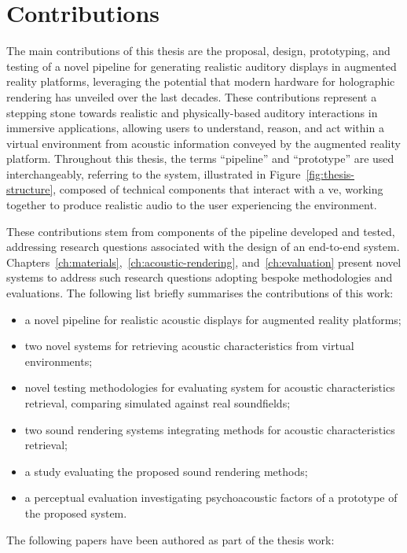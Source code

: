 \section{Contributions}
The main contributions of this thesis are the proposal, design, prototyping, and testing of a novel pipeline for generating realistic auditory displays in augmented reality platforms, leveraging the potential that modern hardware for holographic rendering has unveiled over the last decades. These contributions represent a stepping stone towards realistic and physically-based auditory interactions in immersive applications, allowing users to understand, reason, and act within a virtual environment from acoustic information conveyed by the augmented reality platform. Throughout this thesis, the terms ``pipeline'' and ``prototype'' are used interchangeably, referring to the system, illustrated in Figure~\ref{fig:thesis-structure}, composed of technical components that interact with a \acrshort{ve}, working together to produce realistic audio to the user experiencing the environment.\par
These contributions stem from components of the pipeline developed and tested, addressing research questions associated with the design of an end-to-end system. Chapters~\ref{ch:materials},~\ref{ch:acoustic-rendering}, and~\ref{ch:evaluation} present novel systems to address such research questions adopting bespoke methodologies and evaluations. The following list briefly summarises the contributions of this work:
\begin{itemize}
    \item a novel pipeline for realistic acoustic displays for augmented reality platforms;
    \item two novel systems for retrieving acoustic characteristics from virtual environments;
    \item novel testing methodologies for evaluating system for acoustic characteristics retrieval, comparing simulated against real soundfields;
    \item two sound rendering systems integrating methods for acoustic characteristics retrieval;
    \item a study evaluating the proposed sound rendering methods;
    \item a perceptual evaluation investigating psychoacoustic factors of a prototype of the proposed system.
\end{itemize}

The following papers have been authored as part of the thesis work:

